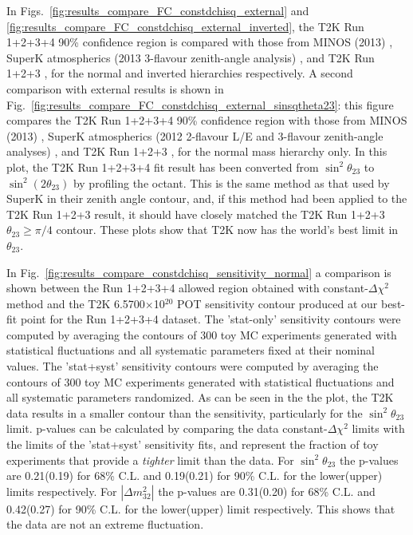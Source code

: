 In Figs.\ \ref{fig:results_compare_FC_constdchisq_external} and \ref{fig:results_compare_FC_constdchisq_external_inverted},
the T2K Run 1+2+3+4 90\% confidence region is compared with 
those from MINOS (2013) \cite{MINOS2013sinsqtheta}, SuperK atmospherics 
(2013 3-flavour 
zenith-angle analysis) \cite{SKAtm2012},
and T2K Run 1+2+3 \cite{T2KRun123Disapp}, for the normal and inverted hierarchies respectively.
A second comparison with external results is shown in Fig.\ \ref{fig:results_compare_FC_constdchisq_external_sinsqtheta23}: 
this figure compares the T2K Run 1+2+3+4 90\% confidence region with
those from MINOS (2013) \cite{MINOS2013}, SuperK atmospherics 
(2012 2-flavour L/E and 3-flavour 
zenith-angle analyses) \cite{SKAtm2012},
and T2K Run 1+2+3 \cite{T2KRun123Disapp},
for the normal mass hierarchy only.
In this plot, the T2K Run 1+2+3+4 fit result has been converted from $\sin^2\theta_{23}$ to
$\sin^2(2\theta_{23})$ by profiling the octant.
This is the same method as that used by SuperK in their zenith angle contour, and,
if this method had been applied to the T2K Run 1+2+3 result, it should have
closely matched the T2K Run 1+2+3 $\theta_{23} \geq \pi/4$ contour.
These plots show that T2K now has the world's best limit in $\theta_{23}$.

In Fig.\ \ref{fig:results_compare_constdchisq_sensitivity_normal}
a comparison is shown
between the Run 1+2+3+4 allowed region obtained 
with constant-$\Delta\chi^{2}$ method and the T2K 6.5700$\times$10$^{20}$ POT sensitivity
contour produced at our best-fit point for the Run 1+2+3+4 dataset.
The 'stat-only' sensitivity contours were computed by averaging the contours of 300 toy MC
experiments generated with statistical fluctuations and all systematic parameters fixed at
their nominal values.
The 'stat+syst' sensitivity contours were computed by averaging the contours of 300 toy MC
experiments generated with statistical fluctuations and all systematic parameters randomized.
As can be seen in the the plot, the T2K data results in a smaller contour than the sensitivity,
particularly for the $\sin^2\theta_{23}$ limit.
p-values can be calculated by comparing the data constant-$\Delta\chi^2$ limits
with the limits of the 'stat+syst' sensitivity fits, and represent the fraction of toy experiments that  provide a \emph{tighter} limit than the data.
For $\sin^2\theta_{23}$ the p-values are 0.21(0.19) for 68\% C.L. and 0.19(0.21) for 90\% C.L. for the lower(upper) limits respectively.
For $|\Delta m^2_{32}|$ the p-values are 0.31(0.20) for 68\% C.L. and 0.42(0.27) for 90\% C.L. for the lower(upper) limit respectively.
This shows that the data are not an extreme fluctuation.

